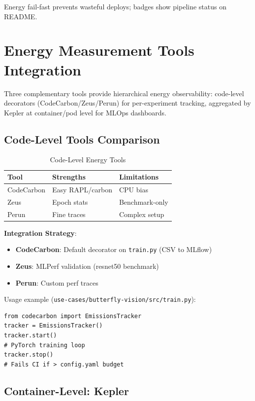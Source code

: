Energy fail-fast prevents wasteful deploys; badges show pipeline status on README.\@

\section{Energy Measurement Tools Integration}

Three complementary tools provide hierarchical energy observability: code-level decorators (CodeCarbon/Zeus/Perun) for per-experiment tracking, aggregated by Kepler at container/pod level for MLOps dashboards.

\subsection{Code-Level Tools Comparison}

\begin{table}[htbp]
\footnotesize
\centering
\caption{Code-Level Energy Tools}
\begin{tabular}{p{2cm} p{3.5cm} p{3cm}}
\toprule
Tool & Strengths & Limitations \\
\midrule
CodeCarbon & Easy RAPL/carbon & CPU bias \\
Zeus & Epoch stats & Benchmark-only \\
Perun & Fine traces & Complex setup \\
\bottomrule
\end{tabular}
\end{table}

\textbf{Integration Strategy}:
\begin{itemize}
\item \textbf{CodeCarbon}: Default decorator on \texttt{train.py} (CSV to MLflow)
\item \textbf{Zeus}: MLPerf validation (resnet50 benchmark)
\item \textbf{Perun}: Custom perf traces
\end{itemize}

Usage example (\texttt{use-cases/butterfly-vision/src/train.py}):

\begin{verbatim}
from codecarbon import EmissionsTracker
tracker = EmissionsTracker()
tracker.start()
# PyTorch training loop
tracker.stop()
# Fails CI if > config.yaml budget
\end{verbatim}

\subsection{Container-Level: Kepler}


